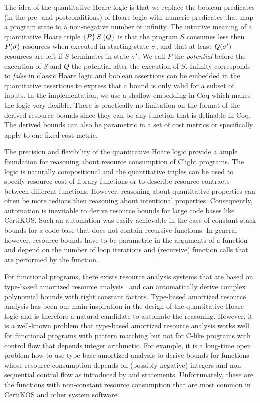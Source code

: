 \documentclass[nocopyrightspace,preprint]{sigplanconf}
\begin{document}
The idea of the quantitative Hoare logic is that we replace the
boolean predicates (in the pre- and postconditions) of Hoare logic
with numeric predicates that map a program state to a non-negative
number or infinity.  The intuitive meaning of a quantitative Hoare
triple $\{P\}\, S\, \{Q\}$ is that the program $S$ consumes less then
$P(\sigma)$ resources when executed in starting state $\sigma$, and
that at least $Q(\sigma')$ resources are left if $S$ terminates in
state $\sigma'$.  We call $P$ the \emph{potential} before the
execution of $S$ and $Q$ the potential after the execution of $S$.
Infinity corresponds to \emph{false} in classic Hoare logic and
boolean assertions can be embedded in the quantitative assertions to
express that a bound is only valid for a subset of inputs.  In the
implementation, we use a shallow embedding in Coq which makes the
logic very flexible.  There is practically no limitation on the format
of the derived resource bounds since they can be any function that is
definable in Coq.  The derived bounds can also be parametric in a set
of cost metrics or specifically apply to one fixed cost metric.

The precision and flexibility of the quantitative Hoare logic provide
a ample foundation for reasoning about resource consumption of Clight
programs.  The logic is naturally compositional and the quantitative
triples can be used to specify resource cost of library functions or
to describe resource contracts between different functions.  However,
reasoning about quantitative properties can often be more tedious then
reasoning about intentional properties.  Consequently, automation is
inevitable to derive resource bounds for large code bases like
CertiKOS.  Such an automation was easily achievable in the case of
constant stack bounds for a code base that does not contain recursive
functions.  In general however, resource bounds have to be parametric
in the arguments of a function and depend on the number of loop
iterations and (recursive) function calls that are performed by the
function.

For functional programs, there exists resource analysis systems that
are based on type-based amortized resource analysis~\cite{Jost03,
  HoffmannAH12} and can automatically derive complex polynomial bounds
with tight constant factors.  Type-based amortized resource analysis
has been our main inspiration in the design of the quantitative Hoare
logic and is therefore a natural candidate to automate the reasoning.
However, it is a well-known problem that type-based amortized resource
analysis works well for functional programs with pattern matching but
not for C-like programs with control flow that depends integer
arithmetic.  For example, it is a long-time open problem how to use
type-base amortized analysis to derive bounds for functions whose
resource consumption depends on (possibly negative) integers and
non-sequential control flow as introduced by  and
 statements.  Unfortunately, these are the functions with
non-constant resource consumption that are most common in CertiKOS and
other system software.
\end{document}
